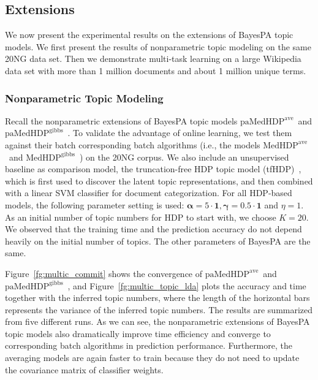\documentclass[twoside,11pt]{article}
\newcommand{\alphav}{\bm \alpha}
\newcommand{\gammav}{\bm \gamma}
\newcommand\paMedHDPave{$\text{paMedHDP}^{\text{ave}}$~}
\newcommand\paMedHDPgibbs{$\text{paMedHDP}^{\text{gibbs}}$~}
\newcommand\MedHDPave{$\text{MedHDP}^{\text{ave}}$~}
\newcommand\MedHDPgibbs{$\text{MedHDP}^{\text{gibbs}}$~}
\newcommand{\strin}[1]{\todo[size=\small, color=green!40]{\bf\sf  #1}}
\newcommand{\jun}[1]{\marginpar{\color{blue}\tiny{Jun: #1}}}
\begin{document}
\subsection{Extensions}

We now present the experimental results on the extensions of BayesPA topic models. We first present the results of nonparametric topic modeling on the same 20NG data set. Then we demonstrate multi-task learning on a large Wikipedia data set with more than 1 million documents and about 1 million unique terms.





\subsubsection{Nonparametric Topic Modeling}

Recall the nonparametric extensions of BayesPA topic models \paMedHDPave and \paMedHDPgibbs. To validate the advantage of online learning, we test them against their batch corresponding batch algorithms (i.e., the models \MedHDPave and \MedHDPgibbs) on the 20NG corpus. We also include an unsupervised baseline as comparison model, the truncation-free HDP topic model (tfHDP)~\citep{wang2012truncation}, which is first used to discover the latent topic representations, and then combined with a linear SVM classifier for document categorization. For all HDP-based models, the following parameter setting is used: $\alphav = 5 \cdot \bm{1}, \gammav = 0.5 \cdot \bm{1}$ and $\eta = 1$. As an initial number of topic numbers for HDP to start with, we choose $K = 20$. We observed that the training time and the prediction accuracy do not depend heavily on the initial number of topics. The other parameters of BayesPA are the same.


Figure~\ref{fg:multic_commit} shows the convergence of \paMedHDPave and \paMedHDPgibbs, and Figure~\ref{fg:multic_topic_lda} plots the accuracy and time together with the inferred topic numbers, where the length of the horizontal bars represents the variance of the inferred topic numbers. The results are summarized from five different runs. As we can see, the nonparametric extensions of BayesPA topic models also dramatically improve time efficiency and converge to corresponding batch algorithms  in prediction performance. Furthermore, the averaging models are again faster to train because they do not need to update the covariance matrix of classifier weights.
\end{document}
